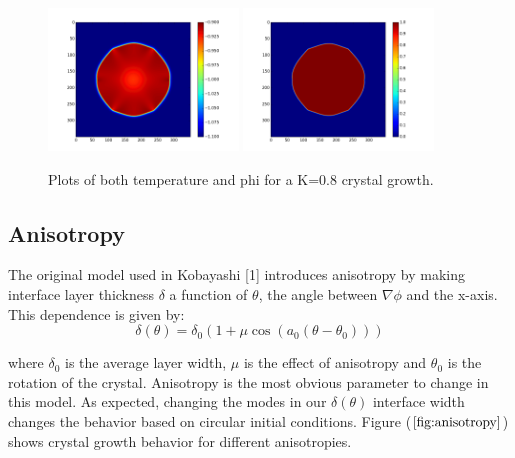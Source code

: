 \documentclass[10pt]{article} %
\begin{document}
\begin{figure}[h!]
  \centering
  \includegraphics[width=0.45\textwidth]{../u-cold-field-3.png}
  \includegraphics[width=0.45\textwidth]{../phi-cold-field-3.png}
  \caption{Plots of both temperature and phi for a K=0.8 crystal growth.}
  \label{fig:latent-heat-cold}
\end{figure}

\subsection{Anisotropy}
The original model used in Kobayashi [1] introduces anisotropy by making interface layer thickness $\delta$ a function of $\theta$, the angle between $\nabla\phi$ and the x-axis. This dependence is given by:\\

\begin{equation}
  \delta(\theta) = \delta_0(1 + \mu\cos(a_0(\theta-\theta_0)))
  \label{eq:kobayoshi-delta}
\end{equation}

where $\delta_0$ is the average layer width, $\mu$ is the effect of anisotropy and $\theta_0$ is the rotation of the crystal. Anisotropy is the most obvious parameter to change in this model. As expected, changing the modes in our $\delta(\theta)$ interface width changes the behavior based on circular initial conditions. Figure ($\ref{fig:anisotropy}$) shows crystal growth behavior for different anisotropies.\\
\end{document}
